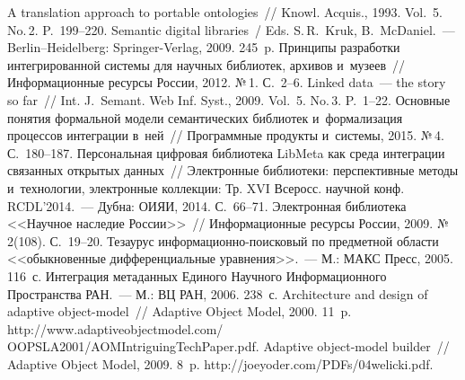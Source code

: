 \begin{multicols}{2}
{\small\frenchspacing
 {%
 \begin{thebibliography}{99}
 A translation approach to portable ontologies~// 
Knowl. Acquis., 
1993. Vol.~5. No.\,2. P.~199--220. 
Semantic digital libraries~/ Eds. S.\,R.~Kruk, B.~McDaniel.~--- Berlin--Heidelberg:  
Springer-Verlag, 2009. 245~p.
 Принципы разработки интегрированной системы для научных 
библиотек, архивов и~музеев~// Информационные ресурсы России, 2012. №\,1. С.~2--6.
 Linked data~--- the story so far~// 
Int. J.~Semant. 
Web Inf. Syst., 2009. Vol.~5. No.\,3. P.~1--22.
 Основные понятия формальной 
модели семантических библиотек и~формализация процессов интеграции в~ней~// 
Программные продукты и~системы, 2015. №\,4. С.~180--187.
 Персональная циф\-ровая библиотека LibMeta как 
среда интеграции связан\-ных открытых данных~// Электронные биб\-лио\-те\-ки: 
перспективные методы и~технологии, электронные коллекции: Тр. XVI Всеросс. научной 
конф. RCDL'2014.~--- Дубна: ОИЯИ, 2014. С.~66--71.
 Электронная библиотека <<Научное 
наследие России>>~// Информационные ресурсы России, 2009. №\,2(108). С.~19--20.
 Тезаурус  
ин\-фор\-ма\-ци\-он\-но-по\-ис\-ко\-вый по предметной области <<обыкновенные 
дифференциальные уравнения>>.~--- М.: МАКС Пресс, 2005. 116~с.
 Интеграция 
метаданных Единого Научного Информационного Пространства РАН.~--- М.: ВЦ РАН, 
2006.  238~с.
 Architecture and design of adaptive  
object-model~// Adaptive Object Model, 2000. 11~p. {\sf 
http://www.adaptiveobjectmodel.com/ OOPSLA2001/AOMIntriguingTechPaper.pdf}.
 Adaptive object-model builder~// Adaptive Object 
Model, 2009. 8~p. {\sf http://joeyoder.com/PDFs/04welicki.pdf}.
 \end{thebibliography}

 }
 }

\end{multicols}

